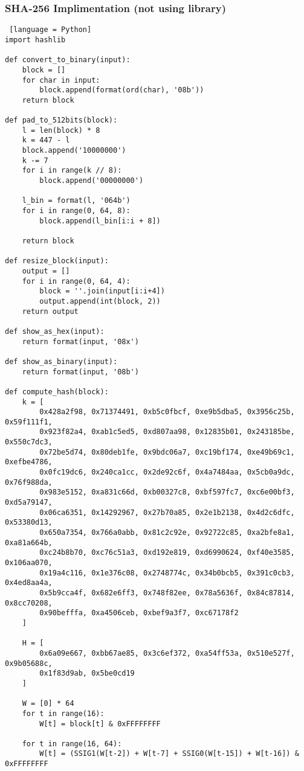 \subsubsection{SHA-256 Implimentation (not using library)}
\begin{lstlisting} [language = Python]
import hashlib

def convert_to_binary(input):
    block = []
    for char in input:
        block.append(format(ord(char), '08b'))
    return block

def pad_to_512bits(block):
    l = len(block) * 8
    k = 447 - l
    block.append('10000000')
    k -= 7
    for i in range(k // 8):
        block.append('00000000')
    
    l_bin = format(l, '064b')
    for i in range(0, 64, 8):
        block.append(l_bin[i:i + 8])
    
    return block

def resize_block(input):
    output = []
    for i in range(0, 64, 4):
        block = ''.join(input[i:i+4])
        output.append(int(block, 2))
    return output

def show_as_hex(input):
    return format(input, '08x')

def show_as_binary(input):
    return format(input, '08b')

def compute_hash(block):
    k = [
        0x428a2f98, 0x71374491, 0xb5c0fbcf, 0xe9b5dba5, 0x3956c25b, 0x59f111f1,
        0x923f82a4, 0xab1c5ed5, 0xd807aa98, 0x12835b01, 0x243185be, 0x550c7dc3,
        0x72be5d74, 0x80deb1fe, 0x9bdc06a7, 0xc19bf174, 0xe49b69c1, 0xefbe4786,
        0x0fc19dc6, 0x240ca1cc, 0x2de92c6f, 0x4a7484aa, 0x5cb0a9dc, 0x76f988da,
        0x983e5152, 0xa831c66d, 0xb00327c8, 0xbf597fc7, 0xc6e00bf3, 0xd5a79147,
        0x06ca6351, 0x14292967, 0x27b70a85, 0x2e1b2138, 0x4d2c6dfc, 0x53380d13,
        0x650a7354, 0x766a0abb, 0x81c2c92e, 0x92722c85, 0xa2bfe8a1, 0xa81a664b,
        0xc24b8b70, 0xc76c51a3, 0xd192e819, 0xd6990624, 0xf40e3585, 0x106aa070,
        0x19a4c116, 0x1e376c08, 0x2748774c, 0x34b0bcb5, 0x391c0cb3, 0x4ed8aa4a,
        0x5b9cca4f, 0x682e6ff3, 0x748f82ee, 0x78a5636f, 0x84c87814, 0x8cc70208,
        0x90befffa, 0xa4506ceb, 0xbef9a3f7, 0xc67178f2
    ]
    
    H = [
        0x6a09e667, 0xbb67ae85, 0x3c6ef372, 0xa54ff53a, 0x510e527f, 0x9b05688c,
        0x1f83d9ab, 0x5be0cd19
    ]
    
    W = [0] * 64
    for t in range(16):
        W[t] = block[t] & 0xFFFFFFFF

    for t in range(16, 64):
        W[t] = (SSIG1(W[t-2]) + W[t-7] + SSIG0(W[t-15]) + W[t-16]) & 0xFFFFFFFF
    

\end{lstlisting}
